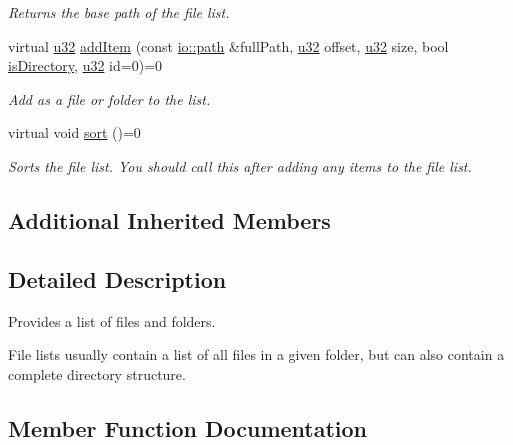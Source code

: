 \begin{DoxyCompactItemize}
\begin{DoxyCompactList}\small\item\em Returns the base path of the file list. \end{DoxyCompactList}\item 
virtual \hyperlink{namespaceirr_a0416a53257075833e7002efd0a18e804}{u32} \hyperlink{classirr_1_1io_1_1IFileList_ad0d90f1bb8a35910f4f877268e2f043e}{add\+Item} (const \hyperlink{namespaceirr_1_1io_ab1bdc45edb3f94d8319c02bc0f840ee1}{io\+::path} \&full\+Path, \hyperlink{namespaceirr_a0416a53257075833e7002efd0a18e804}{u32} offset, \hyperlink{namespaceirr_a0416a53257075833e7002efd0a18e804}{u32} size, bool \hyperlink{classirr_1_1io_1_1IFileList_ac10cdbc20abb0817010d869af0032078}{is\+Directory}, \hyperlink{namespaceirr_a0416a53257075833e7002efd0a18e804}{u32} id=0)=0
\begin{DoxyCompactList}\small\item\em Add as a file or folder to the list. \end{DoxyCompactList}\item 
virtual void \hyperlink{classirr_1_1io_1_1IFileList_a2cf4f12d7ee6ab35257169ec23654da8}{sort} ()=0\hypertarget{classirr_1_1io_1_1IFileList_a2cf4f12d7ee6ab35257169ec23654da8}{}\label{classirr_1_1io_1_1IFileList_a2cf4f12d7ee6ab35257169ec23654da8}

\begin{DoxyCompactList}\small\item\em Sorts the file list. You should call this after adding any items to the file list. \end{DoxyCompactList}\end{DoxyCompactItemize}
\subsection*{Additional Inherited Members}


\subsection{Detailed Description}
Provides a list of files and folders. 

File lists usually contain a list of all files in a given folder, but can also contain a complete directory structure. 

\subsection{Member Function Documentation}
